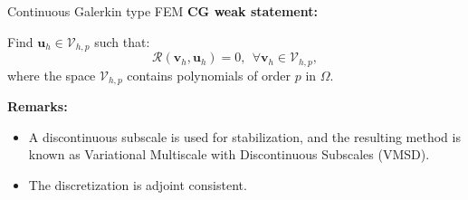 \documentclass{beamer}
\newcounter{sectionframes}
\newcommand{\setsectionframes}[1]{%
  \setcounter{sectionframes}{#1}%
}
\newcounter{sectionframecount}
\begin{document}
\setsectionframes{5}


\begin{frame}[t]{Continuous Galerkin type FEM}
  \textbf{CG weak statement:}

  \vspace{10pt}
  Find $\boldsymbol{u}_{h} \in \mathcal{V}_{h,p}$ such that:
  \begin{equation}
    \mathcal{R}(\boldsymbol{v}_{h},\boldsymbol{u}_{h}) = 0,~~\forall \boldsymbol{v}_{h} \in \mathcal{V}_{h,p},
    \label{e:multiscale_weak_statement}
  \end{equation}
  where the space $\mathcal{V}_{h,p}$ contains polynomials of order $p$ in $\Omega$.

  {
  \vspace{10pt}
  \textbf{Remarks:}
  \begin{itemize}
    \item A discontinuous subscale is used for stabilization, and the resulting method is known as Variational Multiscale with Discontinuous Subscales (VMSD).
    \item The discretization is adjoint consistent.
  \end{itemize}
  }

\end{frame}

\end{document}
